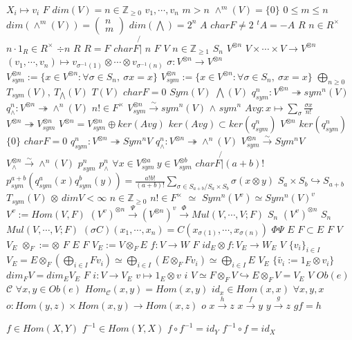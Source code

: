 \documentclass{article}
\begin{document}
$X_i \mapsto v_i$
$F$
$dim(V)=n \in \mathbb{Z}_{\geq 0}$
$v_1,\cdots,v_n$
$m>n$
$\wedge^m(V)=\{0\}$
$0 \leq m \leq n$
$dim(\wedge^m(V))=\begin{pmatrix}n\\ m\end{pmatrix}$
$dim(\bigwedge)=2^n$
$A$
$char F \neq 2$
$^tA=-A$
$R$
$n \in R^\times$
$n \cdot 1_R \in R^\times$
$\div n$
$R$
$R=F$
$char F \not{\vert}$
$n$
$F$
$V$
$n \in \mathbb{Z}_{\geq 1}$
$S_n$
$V^{\otimes n}$
$V \times\cdots\times V \rightarrow V^{\otimes n}$
$(v_1,\cdots,v_n) \mapsto v_{\sigma^{-1}(1)} \otimes\cdots\otimes v_{\sigma^{-1}(n)}$
$\sigma:V^{\otimes n} \rightarrow V^{\otimes n}$
$V^{\otimes n}_{sym}:=\{x\in V^{\otimes n}:\forall \sigma \in S_n,\ \sigma x=x\}$
$V^{\otimes n}_{sym}:=\{x\in V^{\otimes n}:\forall \sigma \in S_n,\ \sigma x=x\}$
$\bigoplus_{n \geq 0}$
$T_{sym}(V),\ T_{\bigwedge}(V)$
$T(V)$
$char F=0$
$Sym(V)$
$\bigwedge(V)$
$q^n_{sym}:V^{\otimes n} \twoheadrightarrow sym^n(V)$
$q^n_{\wedge}:V^{\otimes n} \twoheadrightarrow \wedge^n(V)$
$n! \in F^{\times}$
$V^{\otimes n}_{sym} \stackrel{\sim}{\longrightarrow} sym^n(V)$
$\wedge$
$sym^n$
$Avg:x \mapsto \sum_{\sigma}\frac{\sigma x}{n!}$
$V^{\otimes n} \twoheadrightarrow V^{\otimes n}_{sym}$
$V^{\otimes n}=V^{\otimes n}_{sym} \oplus ker(Avg)$
$ker(Avg) \subset ker(q^n_{sym})$
$V^{\otimes n}$
$ker(q^{n}_{sym})$
$\{0\}$
$charF=0$
$q^n_{sym}:V^{\otimes n} \twoheadrightarrow Sym^nV$
$q^n_{\wedge}:V^{\otimes n} \twoheadrightarrow \wedge^n(V)$
$V^{\otimes n}_{sym} \stackrel{\sim}{\longrightarrow} Sym^nV$
$V^{\otimes n}_\wedge \stackrel{\sim}{\longrightarrow} \wedge^n(V)$
$p^n_{sym}$
$p^{n}_{\wedge}$
$\forall x \in V^{\otimes a}_{sym}\ y \in V^{\otimes b}_{sym}$
$char F \not{\vert} (a+b)!$
$p^{a+b}_{sym}(q^a_{sym}(x)q^b_{sym}(y))=\frac{a!b!}{(a+b)!}\sum_{\sigma \in S_{a+b}/S_a \times S_b}\sigma(x \otimes y)$
$S_a \times S_b \hookrightarrow S_{a+b}$
$T_{sym}(V)$
$\otimes$
$dim V< \infty$
$n \in \mathbb{Z}_{\geq 0}$
$n! \in F^{\times}$
$\simeq$
$Sym^n(V^v) \simeq Sym^n(V)^v$
$V^v:=Hom(V,F)$
$(V^v)^{\otimes n} \stackrel{\Psi}{\longrightarrow} (V^{\otimes n})^v \stackrel{\Phi}{\longrightarrow} Mul(V, \cdots,V;F)$
$S_n$
$(V^v)^{\otimes n}$
$S_n$
$Mul(V,\cdots,V;F)$
$(\sigma C)(x_1,\cdots,x_n)=C(x_{\sigma(1)},\cdots,x_{\sigma(n)})$
$\Phi\Psi$
$E$
$F \subset E$
$F$
$V$
$V_E$
$\otimes_F:= \otimes$
$F$
$E$
$F$
$V_E:=V \otimes_F E$
$f:V \rightarrow W$
$F$
$id_E \otimes f:V_E \rightarrow W_E$
$V$
$\{v_i\}_{i \in I}$
$V_E=E \otimes_F(\bigoplus_{i \in I}Fv_i) \simeq \bigoplus_{i \in I}(E\otimes_FFv_i) \simeq \bigoplus_{i \in I} E$
$V_E$
$\{\tilde{v_i}:=1_E \otimes v_i\}$
$dim_FV=dim_EV_E$
$F$
$i:V \rightarrow V_E$
$v \mapsto 1_E \otimes v$
$i$
$V \simeq F \otimes_F V \hookrightarrow E \otimes_FV=V_E$
$V$
$Ob(e)$
$\mathcal{C}$
$\forall x,y \in Ob(e)$
$Hom_{\mathcal{C}}(x,y)=Hom(x,y)$
$id_x \in Hom(x,x)$
$\forall x,y,x$
$o:Hom(y,z) \times Hom(x,y) \rightarrow Hom(x,z)$
$o$
$x \stackrel{h}{\longrightarrow}z$
$x \stackrel{f}{\longrightarrow} y$
$y \stackrel{g}{\longrightarrow} z$
$gf=h$
$f \in Hom(X,Y)$
$f^{-1} \in Hom(Y,X)$
$f \circ f^{-1}=id_Y$
$f^{-1} \circ f=id_X$
\end{document}
